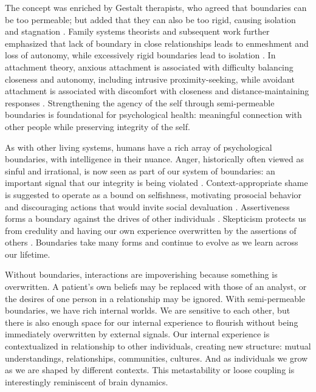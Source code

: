 \documentclass[11pt]{article}
\begin{document}
The concept was enriched by Gestalt therapists, who agreed that boundaries can be too permeable; but added that they can also be too rigid, causing isolation and stagnation \citep{perls1951gestalt, polster1974gestalt, yontef1993awareness}. Family systems theorists and subsequent work further emphasized that lack of boundary in close relationships leads to enmeshment and loss of autonomy, while excessively rigid boundaries lead to isolation \citep{minuchin1974families, bowen1978family, cloud1992boundaries, brown2012daring}. In attachment theory, anxious attachment is associated with difficulty balancing closeness and autonomy, including intrusive proximity-seeking, while avoidant attachment is associated with discomfort with closeness and distance-maintaining responses \citep{ainsworth1978patterns, mikulincer2007attachment, lavy2010autonomy}. Strengthening the agency of the self through semi-permeable boundaries is foundational for psychological health: meaningful connection with other people while preserving integrity of the self. 

As with other living systems, humans have a rich array of psychological boundaries, with intelligence in their nuance. Anger, historically often viewed as sinful and irrational, is now seen as part of our system of boundaries: an important signal that our integrity is being violated \citep{lerner1985dance, videbeck2010psychiatric, sell2011recalibrational}. Context-appropriate shame is suggested to operate as a bound on selfishness, motivating prosocial behavior and discouraging actions that would invite social devaluation \citep{bradshaw1988healing, dehooge2008shame, sznycer2016shame}. Assertiveness forms a boundary against the drives of other individuals \citep{smith1985say}. Skepticism protects us from credulity and having our own experience overwritten by the assertions of others \citep{lewandowsky2012misinformation, sperber2010epistemic}. Boundaries take many forms and continue to evolve as we learn across our lifetime.


Without boundaries, interactions are impoverishing because something is overwritten. A patient's own beliefs may be replaced with those of an analyst, or the desires of one person in a relationship may be ignored. With semi-permeable boundaries, we have rich internal worlds. We are sensitive to each other, but there is also enough space for our internal experience to flourish without being immediately overwritten by external signals. Our internal experience is contextualized in relationship to other individuals, creating new structure: mutual understandings, relationships, communities, cultures. And as individuals we grow as we are shaped by different contexts. This metastability or loose coupling is interestingly reminiscent of brain dynamics.
\end{document}

